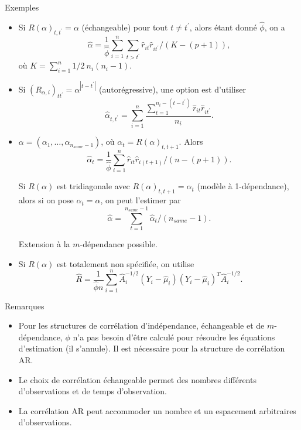 \documentclass{BeamerTemplate}
\begin{document}
\begin{refsection}
\begin{frame}[allowframebreaks]{Exemples}



\begin{itemize}
\item Si $R(\alpha)_{t,t^\prime}=\alpha$ (échangeable) pour tout $t \neq
  t^\prime$, alors étant donné $\hat{\phi}$, on a
$$\hat{\alpha} = \frac{1}{\hat{\phi}} \sum_{i=1}^n \sum_{t>t^\prime} \hat{r}_{it}
\hat{r}_{it^\prime} /(K-(p+1)),$$
où $K = \sum_{i=1}^n 1/2 \ n_i(n_i-1)$.
\item Si $(R_{\alpha,i})_{tt^\prime} = \alpha^{|t-t^\prime|}$
  (autorégressive), une option est d'utiliser
$$\hat{\alpha}_{t,t^\prime} = \sum_{i=1}^n \frac{\sum_{t=1}^{n_i-(t-t^\prime)}\hat{r}_{it}
\hat{r}_{it^\prime}}{n_i}.$$
\item $\alpha = (\alpha_1, \ldots, \alpha_{n_{same}-1})$, où
  $\alpha_t = R(\alpha)_{t,t+1}$. Alors
$$\hat{\alpha}_t = \frac{1}{\hat{\phi}} \sum_{i=1}^n \hat{r}_{it} \hat{r}_{i(t+1)} /
(n-(p+1)).$$


Si $R(\alpha)$ est tridiagonale avec $R(\alpha)_{t,t+1}=\alpha_t$
(modèle à 1-dépendance), alors si on pose $\alpha_t=\alpha$, on peut
l'estimer par
$$\hat{\alpha} =  \sum_{t=1}^{n_{same}-1} \hat{\alpha}_t /(n_{same}-1).$$

\bigskip
Extension à la $m$-dépendance possible.
\item Si $R(\alpha)$ est totalement non spécifiée, on utilise
$$\hat{R} = \frac{1}{\hat{\phi}n} \sum_{i=1}^n \hat{A}_i^{-1/2} (Y_i - \hat{\mu}_i)
(Y_i - \hat{\mu}_i)^T \hat{A}_i^{-1/2}.$$
\end{itemize}
\end{frame}

\begin{frame}{Remarques}
\begin{itemize}
\item Pour les structures de corrélation d'indépendance, échangeable et de $m$-dépendance,
  $\phi$ n'a pas besoin d'être calculé pour résoudre
  les équations d'estimation (il s'annule). Il est nécessaire pour la structure
  de corrélation AR.
\item Le choix de corrélation échangeable permet des nombres différents
  d'observations et de temps d'observation.
\item La corrélation AR peut accommoder un nombre et un espacement
  arbitraires d'observations.
\end{itemize}

\bigskip


\end{frame}
\end{refsection}
\end{document}
